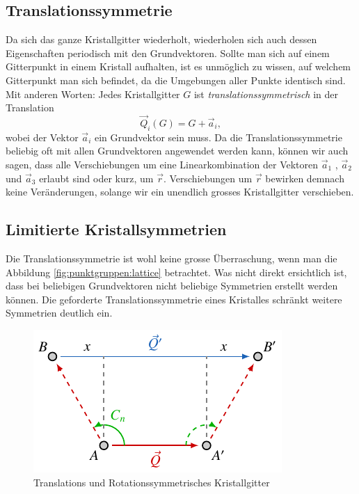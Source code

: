 \subsection{Translationssymmetrie} 
Da sich das ganze Kristallgitter wiederholt, wiederholen sich auch dessen Eigenschaften periodisch mit den Grundvektoren.
Sollte man sich auf einem Gitterpunkt in einem Kristall aufhalten, ist es unmöglich zu wissen, auf welchem Gitterpunkt man sich befindet, da die Umgebungen aller Punkte identisch sind. 
Mit anderen Worten: Jedes Kristallgitter $ G $ ist \emph{translationssymmetrisch} in der Translation 
\[
    \vec{Q}_i(G) = G + \vec{a}_i,
\]
wobei der Vektor $\vec{a}_i$ ein Grundvektor sein muss.
Da die Translationssymmetrie beliebig oft mit allen Grundvektoren angewendet werden kann, 
können wir auch sagen, dass alle Verschiebungen um eine Linearkombination 
der Vektoren $\vec{a}_1$ , $\vec{a}_2$ und $\vec{a}_3$ erlaubt sind oder kurz, um $\vec{r}$. 
Verschiebungen um $\vec{r}$ bewirken demnach keine Veränderungen, 
solange wir ein unendlich grosses Kristallgitter verschieben.

\subsection{Limitierte Kristallsymmetrien} \label{txt:punktgruppen:Translationssymmetrie}
 Die Translationssymmetrie ist wohl keine grosse Überraschung, wenn man die Abbildung \ref{fig:punktgruppen:lattice} betrachtet.
 Was nicht direkt ersichtlich ist, dass bei beliebigen Grundvektoren nicht beliebige Symmetrien erstellt werden können.
 Die geforderte Translationssymmetrie eines Kristalles schränkt weitere Symmetrien deutlich ein.
  
\begin{figure}
    \centering
    \includegraphics[]{papers/punktgruppen/figures/combine-symmetries}
    \caption{
        Translations und Rotationssymmetrisches Kristallgitter
    }
    \label{fig:punktgruppen:rot-geometry}
\end{figure}

